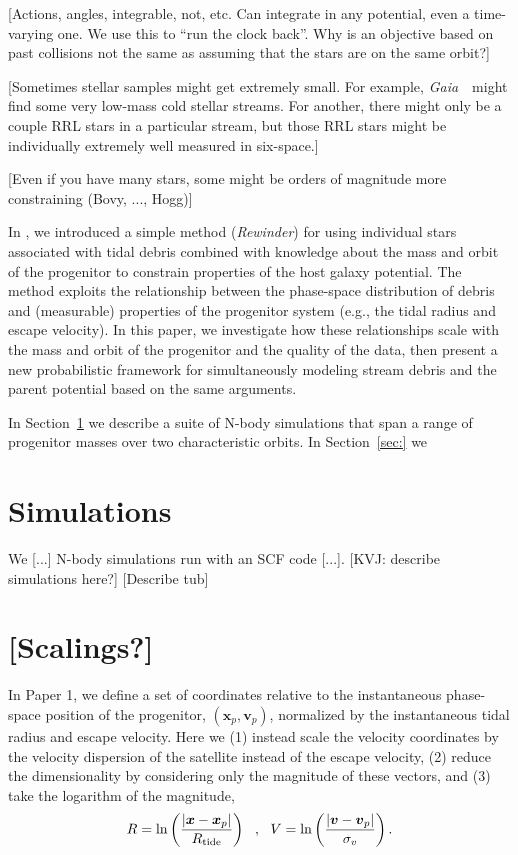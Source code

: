 \documentclass[letterpaper,12pt,preprint]{aastex}
\newcommand{\project}[1]{\textsl{#1}}
\newcommand{\gaia}{\project{Gaia}~}
\newcommand{\bs}{\boldsymbol}
\newcommand{\paperone}{Paper 1}
\begin{document}
[Actions, angles, integrable, not, etc.  Can integrate in any
  potential, even a time-varying one. We use this to
  ``run the clock back''.  Why is an objective based on past collisions not the
  same as assuming that the stars are on the same orbit?]

[Sometimes stellar samples might get extremely small.  For example,
  \gaia\ might find some very low-mass cold stellar streams.  For
  another, there might only be a couple RRL stars in a particular
  stream, but those RRL stars might be individually extremely well
  measured in six-space.]

[Even if you have many stars, some might be orders of magnitude more constraining (Bovy, ..., Hogg)]

In \citet[][hereafter \paperone]{apw13}, we introduced a simple method (\emph{Rewinder}) for using individual stars associated with tidal debris combined with knowledge about the mass and orbit of the progenitor to constrain properties of the host galaxy potential. The method exploits the relationship between the phase-space distribution of debris and (measurable) properties of the progenitor system (e.g., the tidal radius and escape velocity). In this paper, we investigate how these relationships scale with the mass and orbit of the progenitor and the quality of the data, then present a new probabilistic framework for simultaneously modeling stream debris and the parent potential based on the same arguments.

In Section~\ref{sec:sims} we describe a suite of N-body simulations that span a range of progenitor masses over two characteristic orbits. In Section~\ref{sec:} we 

\section{Simulations}\label{sec:sims}

We [...] N-body simulations run with an SCF code [...]. [KVJ: describe simulations here?] [Describe tub]

\section{[Scalings?]}

In \paperone, we define a set of coordinates relative to the instantaneous phase-space position of the progenitor, $(\bs{x}_{p},\bs{v}_{p})$, normalized by the instantaneous tidal radius and escape velocity. Here we (1) instead scale the velocity coordinates by the velocity dispersion of the satellite instead of the escape velocity, (2) reduce the dimensionality by considering only the magnitude of these vectors, and (3) take the logarithm of the magnitude,
\begin{equation}
  R = \ln\left(\frac{\left\vert\bs{x} - \bs{x}_{p}\right\vert}{R_{\rm tide}}\right)\,\,\,\,,\,\,\,\,
  V = \ln\left(\frac{\left\vert\bs{v} - \bs{v}_{p}\right\vert}{\sigma_v}\right).
\end{equation}
\end{document}
